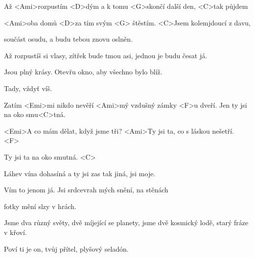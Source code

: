 

\zs
Až <Ami>rozpustím <D>dým a k tomu
<G>skončí další den, <C>tak půjdem

<Ami>oba domů <D>za tím svým <G>
štěstím. <C>Jsem kolemjdoucí z davu,

součást osudu, a budu
tebou znovu oslněn.
\ks

\zs
Až rozpustíš si vlasy, zítřek bude tmou
asi, jednou je budu česat já.

Jsou plný krásy. Otevřu okno,
aby všechno bylo blíž.

Tady, vždyť víš.
\ks


\zr \kr

\zs
Zatím <Emi>mi nikdo nevěří <Ami>mý vzdušný zámky
<F>u dveří. Jen ty jsi na oko smu<C>tná.

<Emi>A co mám dělat, když jsme tři? <Ami>Ty jsi ta, co s láskou 
nešetří. <F>

Ty jsi ta na oko smutná. <C>
\ks

\zs
Láhev vína dohasíná a ty jsi
zas tak jiná, jsi moje.

Vím to jenom já. Jsi srdcevrah
mých snění, na stěnách

fotky mění slzy v hrách.

\ks

\zr \kr

\zs
Jsme dva různý světy, dvě míjející se planety,
jsme dvě kosmický lodě, starý fráze v křoví.

Poví ti je on, tvůj přítel,
plyšový seladón.
\ks


\zr \kr

\kp
